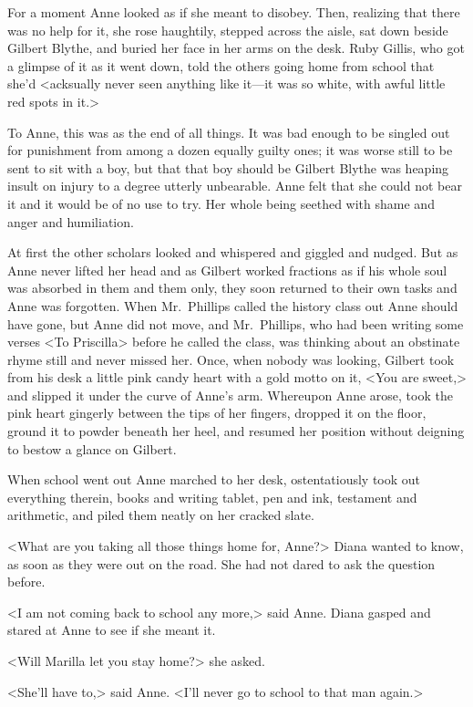For a moment Anne looked as if she meant to disobey. Then, realizing that there was no help for it, she rose haughtily, stepped across the aisle, sat down beside Gilbert Blythe, and buried her face in her arms on the desk. Ruby Gillis, who got a glimpse of it as it went down, told the others going home from school that she'd <acksually never seen anything like it—it was so white, with awful little red spots in it.>

To Anne, this was as the end of all things. It was bad enough to be singled out for punishment from among a dozen equally guilty ones; it was worse still to be sent to sit with a boy, but that that boy should be Gilbert Blythe was heaping insult on injury to a degree utterly unbearable. Anne felt that she could not bear it and it would be of no use to try. Her whole being seethed with shame and anger and humiliation.

At first the other scholars looked and whispered and giggled and nudged. But as Anne never lifted her head and as Gilbert worked fractions as if his whole soul was absorbed in them and them only, they soon returned to their own tasks and Anne was forgotten. When Mr.~Phillips called the history class out Anne should have gone, but Anne did not move, and Mr.~Phillips, who had been writing some verses <To Priscilla> before he called the class, was thinking about an obstinate rhyme still and never missed her. Once, when nobody was looking, Gilbert took from his desk a little pink candy heart with a gold motto on it, <You are sweet,> and slipped it under the curve of Anne's arm. Whereupon Anne arose, took the pink heart gingerly between the tips of her fingers, dropped it on the floor, ground it to powder beneath her heel, and resumed her position without deigning to bestow a glance on Gilbert.

When school went out Anne marched to her desk, ostentatiously took out everything therein, books and writing tablet, pen and ink, testament and arithmetic, and piled them neatly on her cracked slate.

<What are you taking all those things home for, Anne?> Diana wanted to know, as soon as they were out on the road. She had not dared to ask the question before.

<I am not coming back to school any more,> said Anne. Diana gasped and stared at Anne to see if she meant it.

<Will Marilla let you stay home?> she asked.

<She'll have to,> said Anne. <I'll never go to school to that man again.>

